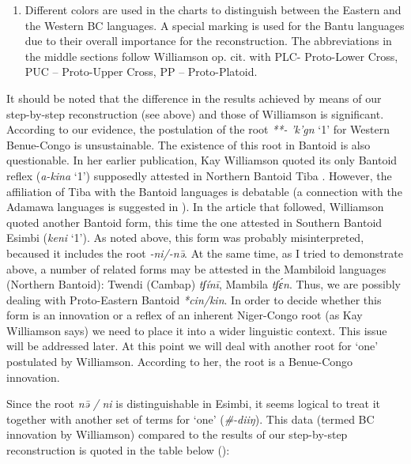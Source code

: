 \begin{enumerate}
\item Different colors are used in the charts to distinguish between the Eastern and the Western BC languages. A special marking is used for the Bantu languages due to their overall importance for the reconstruction. The abbreviations in the middle sections follow Williamson op. cit. with PLC- Proto-Lower Cross, PUC – Proto-Upper Cross, PP – Proto-Platoid.
\end{enumerate}
It should be noted that the difference in the results achieved by means of our step-by-step reconstruction (see above) and those of Williamson is significant. According to our evidence, the postulation of the root \textit{**-} \textit{'k{}'g{}n{}} ‘1’ for Western Benue-Congo is unsustainable. The existence of this root in Bantoid is also questionable. In her earlier publication, Kay Williamson quoted its only Bantoid reflex (\textit{a-kina} ‘1’) supposedly attested in Northern Bantoid Tiba \citep[255]{Williamson1989b}. However, the affiliation of Tiba with the Bantoid languages is debatable (a connection with the Adamawa languages is suggested in \citealt{Boyd1999}). In the article that followed, Williamson quoted another Bantoid form, this time the one attested in Southern Bantoid Esimbi (\textit{keni} ‘1’). As noted above, this form was probably misinterpreted, becaused it includes the root \textit{-ni/-n{\={ə}}}. At the same time, as I tried to demonstrate above, a number of related forms may be attested in the Mambiloid languages (Northern Bantoid): Twendi (Cambap) \textit{tʃín{\={i}}}, Mambila \textit{tʃ{\'{ɛ}}n}. Thus, we are possibly dealing with Proto-Eastern Bantoid \textit{*cin/kin}. In order to decide whether this form is an innovation or a reflex of an inherent Niger-Congo root (as Kay Williamson says) we need to place it into a wider linguistic context. This issue will be addressed later. At this point we will deal with another root for ‘one’ postulated by Williamson. According to her, the root is a Benue-Congo innovation.

Since the root \textit{n{\={ə}}} \textit{/} \textit{ni} is distinguishable in Esimbi, it seems logical to treat it together with another set of terms for ‘one’ (\textit{\#-diiŋ}). This data (termed BC innovation by Williamson) compared to the results of our step-by-step reconstruction is quoted in the table below ():

